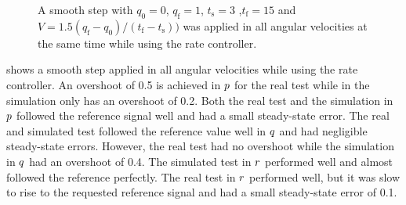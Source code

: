 \begin{figure}
\centering
  \qquad 
  \qquad
  \qquad
  \qquad
  \qquad
  \caption{\label{fig:StepAllRate}%
  A smooth step with $q_{\text{0}} = 0$, $q_{\text{f}} = 1$, $t_{\text{s}} = 3$ ,$t_{\text{f}} = 15$ and $V = 1.5 (q_{\text{f}} - q_{\text{0}})/(t_{\text{f}} - t_{\text{s}}))$ was applied in all angular velocities at the same time while using the rate controller.}
\end{figure}

 shows a smooth step applied in all angular velocities while using the rate controller. An overshoot of 0.5 is achieved in $p$ for the real test while in the simulation only has an overshoot of 0.2. Both the real test and the simulation in $p$ followed the reference signal well and had a small steady-state error. The real and simulated test followed the reference value well in $q$ and had negligible steady-state errors. However, the real test had no overshoot while the simulation in $q$ had an overshoot of 0.4. The simulated test in $r$ performed well and almost followed the reference perfectly. The real test in $r$ performed well, but it was slow to rise to the requested reference signal and had a small steady-state error of 0.1. 

